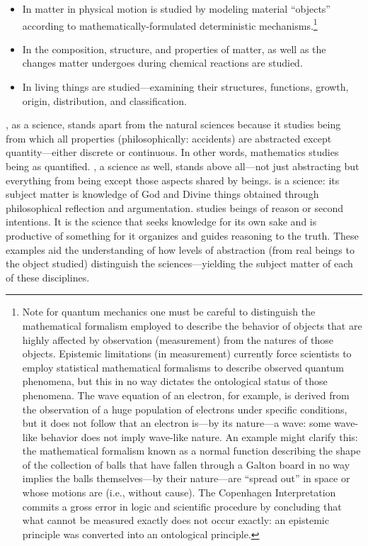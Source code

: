 \begin{itemize}
\item In  matter in physical motion is studied by modeling material ``objects'' according to mathematically-formulated deterministic mechanisms.\footnote{Note for quantum mechanics one must be careful to distinguish the mathematical formalism employed to describe the behavior of objects that are highly affected by observation (measurement) from the natures of those objects. Epistemic limitations (in measurement) currently force scientists to employ statistical mathematical formalisms to describe observed quantum phenomena, but this in no way dictates the ontological status of those phenomena. The wave equation of an electron, for example, is derived from the observation of a huge population of electrons under specific conditions, but it does not follow that an electron is---by its nature---a wave: some wave-like behavior does not imply wave-like nature. An example might clarify this: the mathematical formalism known as a normal function describing the shape of the collection of balls that have fallen through a Galton board in no way implies the balls themselves---by their nature---are ``spread out'' in space or whose motions are  (i.e., without cause). The Copenhagen Interpretation commits a gross error in logic and scientific procedure by concluding that what cannot be measured exactly does not occur exactly: an epistemic principle was converted into an ontological principle.}
\item In  the composition, structure, and properties of matter, as well as the changes matter undergoes during chemical reactions are studied.
\item In  living things are studied---examining their structures, functions, growth, origin, distribution, and classification.
\end{itemize}

, as a science, stands apart from the natural sciences because it studies being from which all properties (philosophically: accidents) are abstracted except quantity---either discrete or continuous. In other words, mathematics studies being as quantified. , a science as well, stands above all---not just abstracting but  everything from being except those aspects shared by  beings.  is a science: its subject matter is knowledge of God and Divine things obtained through philosophical reflection and argumentation.  studies beings of reason or second intentions. It is the science that seeks knowledge for its own sake and is productive of something for it organizes and guides reasoning to the truth. These examples aid the understanding of how levels of abstraction (from real beings to the object studied) distinguish the sciences---yielding the subject matter of each of these disciplines.


